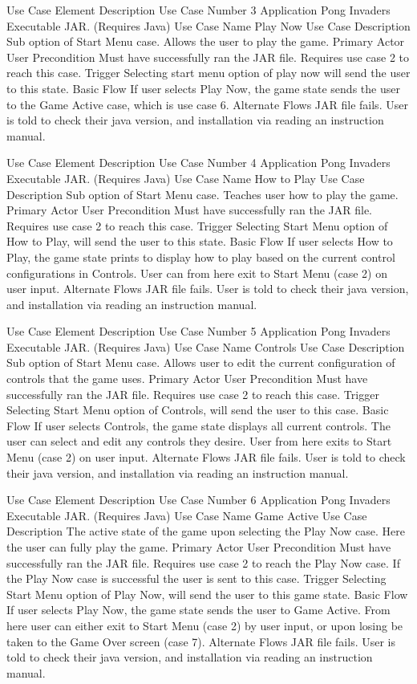 \documentclass[12pt, titlepage]{article}
\begin{document}
Use Case Element
Description
Use Case Number
3
Application
Pong Invaders Executable JAR. (Requires Java)
Use Case Name
Play Now
Use Case Description
Sub option of Start Menu case. Allows the user to play the game.
Primary Actor
User 
Precondition
Must have successfully ran the JAR file. Requires use case 2 to reach this case.
Trigger
Selecting start menu option of play now will send the user to this state.
Basic Flow
If user selects Play Now, the game state sends the user to the Game Active case, which is use case 6.
Alternate Flows
JAR file fails. User is told to check their java version, and installation via reading an instruction manual.


Use Case Element
Description
Use Case Number
4
Application
Pong Invaders Executable JAR. (Requires Java)
Use Case Name
How to Play
Use Case Description
Sub option of Start Menu case. Teaches user how to play the game.
Primary Actor
User 
Precondition
Must have successfully ran the JAR file. Requires use case 2 to reach this case.
Trigger
Selecting Start Menu option of How to Play, will send the user to this state.
Basic Flow
If user selects How to Play, the game state prints to display how to play based on the current control configurations in Controls. User can from here exit to Start Menu (case 2) on user input.
Alternate Flows
JAR file fails. User is told to check their java version, and installation via reading an instruction manual.


Use Case Element
Description
Use Case Number
5
Application
Pong Invaders Executable JAR. (Requires Java)
Use Case Name
Controls
Use Case Description
Sub option of Start Menu case. Allows user to edit the current configuration of controls that the game uses.
Primary Actor
User 
Precondition
Must have successfully ran the JAR file. Requires use case 2 to reach this case.
Trigger
Selecting Start Menu option of Controls, will send the user to this case.
Basic Flow
If user selects Controls, the game state displays all current controls. The user can select and edit any controls they desire. User from here exits to Start Menu (case 2) on user input.
Alternate Flows
JAR file fails. User is told to check their java version, and installation via reading an instruction manual.


Use Case Element
Description
Use Case Number
6
Application
Pong Invaders Executable JAR. (Requires Java)
Use Case Name
Game Active
Use Case Description
The active state of the game upon selecting the Play Now case. Here the user can fully play the game.
Primary Actor
User 
Precondition
Must have successfully ran the JAR file. Requires use case 2 to reach the Play Now case. If the Play Now case is successful the user is sent to this case.
Trigger
Selecting Start Menu option of Play Now, will send the user to this game state.
Basic Flow
If user selects Play Now, the game state sends the user to Game Active. From here user can either exit to Start Menu (case 2) by user input, or upon losing be taken to the Game Over screen (case 7).
Alternate Flows
JAR file fails. User is told to check their java version, and installation via reading an instruction manual.
\end{document}
